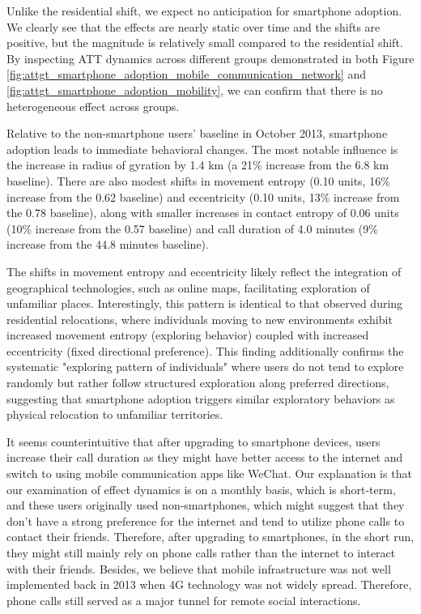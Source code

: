 Unlike the residential shift, we expect no anticipation for smartphone adoption.
We clearly see that the effects are nearly static over time and the shifts are positive, but the magnitude is relatively small compared to the residential shift.
By inspecting ATT dynamics across different groups demonstrated in both Figure \ref{fig:attgt_smartphone_adoption_mobile_communication_network} and \ref{fig:attgt_smartphone_adoption_mobility}, we can confirm that there is no heterogeneous effect across groups.

Relative to the non-smartphone users' baseline in October 2013, smartphone adoption leads to immediate behavioral changes.
The most notable influence is the increase in radius of gyration by 1.4 km (a 21\% increase from the 6.8 km baseline).
There are also modest shifts in movement entropy (0.10 units, 16\% increase from the 0.62 baseline) and eccentricity (0.10 units, 13\% increase from the 0.78 baseline), along with smaller increases in contact entropy of 0.06 units (10\% increase from the 0.57 baseline) and call duration of 4.0 minutes (9\% increase from the 44.8 minutes baseline).

The shifts in movement entropy and eccentricity likely reflect the integration of geographical technologies, such as online maps, facilitating exploration of unfamiliar places.
Interestingly, this pattern is identical to that observed during residential relocations, where individuals moving to new environments exhibit increased movement entropy (exploring behavior) coupled with increased eccentricity (fixed directional preference).
This finding additionally confirms the systematic "exploring pattern of individuals" where users do not tend to explore randomly but rather follow structured exploration along preferred directions, suggesting that smartphone adoption triggers similar exploratory behaviors as physical relocation to unfamiliar territories.

It seems counterintuitive that after upgrading to smartphone devices, users increase their call duration as they might have better access to the internet and switch to using mobile communication apps like WeChat.
Our explanation is that our examination of effect dynamics is on a monthly basis, which is short-term, and these users originally used non-smartphones, which might suggest that they don't have a strong preference for the internet and tend to utilize phone calls to contact their friends.
Therefore, after upgrading to smartphones, in the short run, they might still mainly rely on phone calls rather than the internet to interact with their friends.
Besides, we believe that mobile infrastructure was not well implemented back in 2013 when 4G technology was not widely spread.
Therefore, phone calls still served as a major tunnel for remote social interactions.
